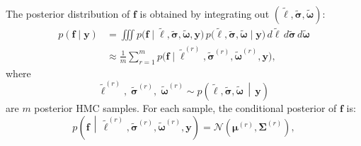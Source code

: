 \documentclass[]{interact}
\theoremstyle{plain}%
\theoremstyle{definition}
\theoremstyle{remark}
\begin{document}
The posterior distribution of $\mathbf{f}$ is obtained by integrating out $(\tilde{\boldsymbol{\ell}}, \tilde{\boldsymbol{\sigma}}, \tilde{\boldsymbol{\omega}})$:
\begin{equation}
		\begin{aligned}
			p(\mathbf{f}\mid \mathbf{y})
			&= \iiint
			p\bigl(\mathbf{f}\mid \widetilde{\boldsymbol{\ell}},\widetilde{\boldsymbol{\sigma}},
			\widetilde{\boldsymbol{\omega}},\mathbf{y}\bigr)\,
			p\bigl(\widetilde{\boldsymbol{\ell}},\widetilde{\boldsymbol{\sigma}},
			\widetilde{\boldsymbol{\omega}}\mid \mathbf{y}\bigr)\,
			d\widetilde{\boldsymbol{\ell}}\,
			d\widetilde{\boldsymbol{\sigma}}\,
			d\widetilde{\boldsymbol{\omega}} \\
			&\approx \frac{1}{m}\sum_{r=1}^{m}
			p\bigl(\mathbf{f}\mid
			\widetilde{\boldsymbol{\ell}}^{(r)},
			\widetilde{\boldsymbol{\sigma}}^{(r)},
			\widetilde{\boldsymbol{\omega}}^{(r)},
			\mathbf{y}\bigr),
		\end{aligned}
\end{equation}
where
\begin{equation}
	\widetilde{\boldsymbol{\ell}}^{(r)},\;
	\widetilde{\boldsymbol{\sigma}}^{(r)},\;
	\widetilde{\boldsymbol{\omega}}^{(r)}
	\sim
	p\!\left(
	\widetilde{\boldsymbol{\ell}},
	\widetilde{\boldsymbol{\sigma}},
	\widetilde{\boldsymbol{\omega}}
	\,\middle|\,
	\mathbf{y}
	\right)
\end{equation}
are $m$ posterior HMC samples. For each sample, the conditional posterior of $\mathbf{f}$ is:
\begin{equation}
	p\!\left(
	\mathbf{f}\,\middle|\,
	\widetilde{\boldsymbol{\ell}}^{(r)},
	\widetilde{\boldsymbol{\sigma}}^{(r)},
	\widetilde{\boldsymbol{\omega}}^{(r)},
	\mathbf{y}
	\right)
	=
	\mathcal{N}\!\left(
	\boldsymbol{\mu}^{(r)},
	\boldsymbol{\Sigma}^{(r)}
	\right),
\end{equation}
\end{document}
